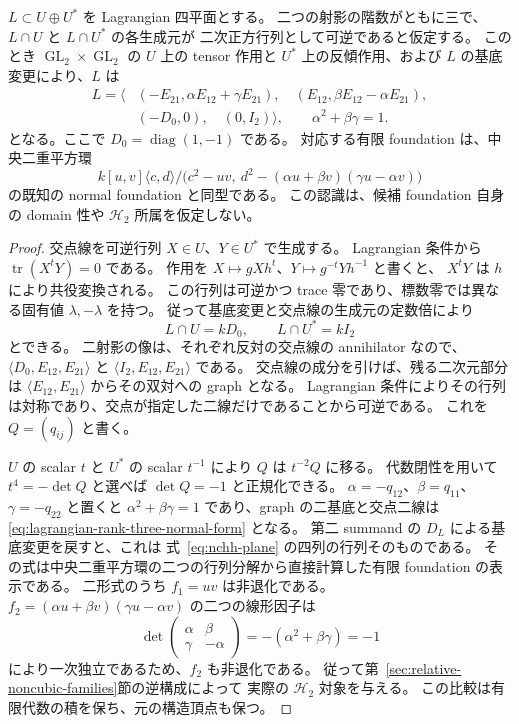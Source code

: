 \begin{lemma}
\label{lem:lagrangian-double-rank-three-recognition}
$L\subset U\oplus U^*$ を Lagrangian 四平面とする。
二つの射影の階数がともに三で、$L\cap U$ と $L\cap U^*$ の各生成元が
二次正方行列として可逆であると仮定する。
このとき $\operatorname{GL}_2\times\operatorname{GL}_2$ の $U$ 上の tensor 作用と
$U^*$ 上の反傾作用、および $L$ の基底変更により、$L$ は
\begin{equation}\label{eq:lagrangian-rank-three-normal-form}
\begin{aligned}
 L=\bigl\langle&(-E_{21},\alpha E_{12}+\gamma E_{21}),\quad
 (E_{12},\beta E_{12}-\alpha E_{21}),\\
 &(-D_0,0),\quad (0,I_2)\bigr\rangle,
 \qquad \alpha^2+\beta\gamma=1.
\end{aligned}
\end{equation}
となる。ここで $D_0=\operatorname{diag}(1,-1)$ である。
対応する有限 foundation は、中央二重平方環
\[
 k[u,v]\langle c,d\rangle/
 \bigl(c^2-uv,\ d^2-(\alpha u+\beta v)(\gamma u-\alpha v)\bigr)
\]
の既知の normal foundation と同型である。
この認識は、候補 foundation 自身の domain 性や $\mathcal H_2$ 所属を仮定しない。
\end{lemma}
\begin{proof}
交点線を可逆行列 $X\in U$、$Y\in U^*$ で生成する。
Lagrangian 条件から $\operatorname{tr}(X^tY)=0$ である。
作用を $X\mapsto gXh^t$、$Y\mapsto g^{-t}Yh^{-1}$ と書くと、
$X^tY$ は $h$ により共役変換される。
この行列は可逆かつ trace 零であり、標数零では異なる固有値 $\lambda,-\lambda$ を持つ。
従って基底変更と交点線の生成元の定数倍により
\[
 L\cap U=kD_0,\qquad L\cap U^*=kI_2
\]
とできる。
二射影の像は、それぞれ反対の交点線の annihilator なので、
$\langle D_0,E_{12},E_{21}\rangle$ と
$\langle I_2,E_{12},E_{21}\rangle$ である。
交点線の成分を引けば、残る二次元部分は
$\langle E_{12},E_{21}\rangle$ からその双対への graph となる。
Lagrangian 条件によりその行列は対称であり、交点が指定した二線だけであることから可逆である。
これを $Q=(q_{ij})$ と書く。

$U$ の scalar $t$ と $U^*$ の scalar $t^{-1}$ により $Q$ は $t^{-2}Q$ に移る。
代数閉性を用いて $t^4=-\det Q$ と選べば $\det Q=-1$ と正規化できる。
$\alpha=-q_{12}$、$\beta=q_{11}$、$\gamma=-q_{22}$ と置くと
$\alpha^2+\beta\gamma=1$ であり、graph の二基底と交点二線は
\eqref{eq:lagrangian-rank-three-normal-form} となる。
第二 summand の $D_L$ による基底変更を戻すと、これは
式~\ref{eq:nchh-plane} の四列の行列そのものである。
その式は中央二重平方環の二つの行列分解から直接計算した有限 foundation の表示である。
二形式のうち $f_1=uv$ は非退化である。
$f_2=(\alpha u+\beta v)(\gamma u-\alpha v)$ の二つの線形因子は
\[
 \det\begin{pmatrix}\alpha&\beta\\\gamma&-\alpha\end{pmatrix}
 =-(\alpha^2+\beta\gamma)=-1
\]
により一次独立であるため、$f_2$ も非退化である。
従って第~\ref{sec:relative-noncubic-families}節の逆構成によって
実際の $\mathcal H_2$ 対象を与える。
この比較は有限代数の積を保ち、元の構造頂点も保つ。
\end{proof}

